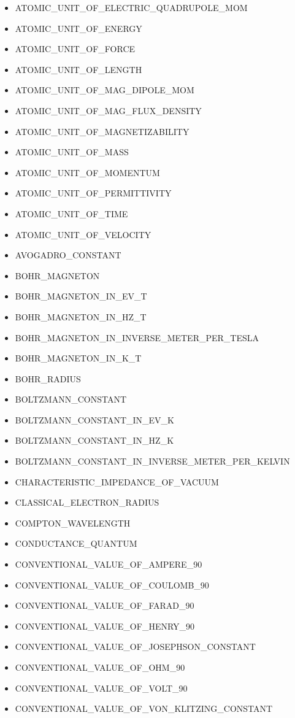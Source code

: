 \begin{itemize}
\item ATOMIC\_UNIT\_OF\_ELECTRIC\_QUADRUPOLE\_MOM
\item ATOMIC\_UNIT\_OF\_ENERGY
\item ATOMIC\_UNIT\_OF\_FORCE
\item ATOMIC\_UNIT\_OF\_LENGTH
\item ATOMIC\_UNIT\_OF\_MAG\_DIPOLE\_MOM
\item ATOMIC\_UNIT\_OF\_MAG\_FLUX\_DENSITY
\item ATOMIC\_UNIT\_OF\_MAGNETIZABILITY
\item ATOMIC\_UNIT\_OF\_MASS
\item ATOMIC\_UNIT\_OF\_MOMENTUM
\item ATOMIC\_UNIT\_OF\_PERMITTIVITY
\item ATOMIC\_UNIT\_OF\_TIME
\item ATOMIC\_UNIT\_OF\_VELOCITY
\item AVOGADRO\_CONSTANT
\item BOHR\_MAGNETON
\item BOHR\_MAGNETON\_IN\_EV\_T
\item BOHR\_MAGNETON\_IN\_HZ\_T
\item BOHR\_MAGNETON\_IN\_INVERSE\_METER\_PER\_TESLA
\item BOHR\_MAGNETON\_IN\_K\_T
\item BOHR\_RADIUS
\item BOLTZMANN\_CONSTANT
\item BOLTZMANN\_CONSTANT\_IN\_EV\_K
\item BOLTZMANN\_CONSTANT\_IN\_HZ\_K
\item BOLTZMANN\_CONSTANT\_IN\_INVERSE\_METER\_PER\_KELVIN
\item CHARACTERISTIC\_IMPEDANCE\_OF\_VACUUM
\item CLASSICAL\_ELECTRON\_RADIUS
\item COMPTON\_WAVELENGTH
\item CONDUCTANCE\_QUANTUM
\item CONVENTIONAL\_VALUE\_OF\_AMPERE\_90
\item CONVENTIONAL\_VALUE\_OF\_COULOMB\_90
\item CONVENTIONAL\_VALUE\_OF\_FARAD\_90
\item CONVENTIONAL\_VALUE\_OF\_HENRY\_90
\item CONVENTIONAL\_VALUE\_OF\_JOSEPHSON\_CONSTANT
\item CONVENTIONAL\_VALUE\_OF\_OHM\_90
\item CONVENTIONAL\_VALUE\_OF\_VOLT\_90
\item CONVENTIONAL\_VALUE\_OF\_VON\_KLITZING\_CONSTANT

\end{itemize}
